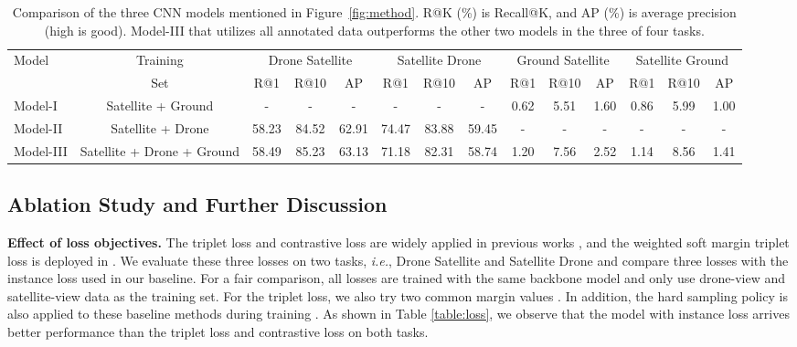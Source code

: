 \documentclass[sigconf]{acmart}
\def\ie{\emph{i.e.}}
\begin{document}
\setlength{\tabcolsep}{5pt}
\begin{table*}
\small
\begin{center}
\begin{tabular}{l|c|ccc|ccc|ccc|ccc}
\hline
\multirow{2}{*}{Model} & Training & \multicolumn{3}{c|}{Drone  Satellite} & \multicolumn{3}{c|}{Satellite  Drone} & \multicolumn{3}{c|}{Ground  Satellite} & 
\multicolumn{3}{c}{Satellite  Ground}\\
  & Set & R@1 & R@10 & AP & R@1 & R@10 & AP & R@1 & R@10 & AP & R@1 & R@10 & AP \\
\shline
Model-I & Satellite + Ground & - & - & - & - & - & - & 0.62 & 5.51 & 1.60 & 0.86 & 5.99 & 1.00 \\
Model-II & Satellite + Drone & 58.23 & 84.52 & 62.91 & 74.47 & 83.88 & 59.45 & - & - & - & - & - & -\\
Model-III & Satellite + Drone + Ground & 58.49 & 85.23 &  63.13 & 71.18 & 82.31 & 58.74 & 1.20 & 7.56 & 2.52 & 1.14 & 8.56 & 1.41 \\
\hline
\end{tabular}
\end{center}
\caption{Comparison of the three CNN models mentioned in Figure~\ref{fig:method}. R@K (\%) is Recall@K, and AP (\%) is average precision (high is good). Model-III that utilizes all annotated data outperforms the other two models in the three of four tasks.
}
\vspace{-.2in}
\label{table:Baseline}
\end{table*}


\subsection{Ablation Study and Further Discussion} \label{sec:ablation}
\noindent\textbf{Effect of loss objectives.}
The triplet loss and contrastive loss are widely applied in previous works \cite{lin2015learning,workman2015wide,deng2018triplet,chechik2010large,zheng2016discriminatively}, and the weighted soft margin triplet loss is deployed in \cite{hu2018cvm,liu2019lending,cai2019ground}. We evaluate these three losses on two tasks, \ie, Drone  Satellite and Satellite  Drone and compare three losses with the instance loss used in our baseline. For a fair comparison, all losses are trained with the same backbone model and only use drone-view and satellite-view data as the training set. For the triplet loss, we also try two common margin values . In addition, the hard sampling policy is also applied to these baseline methods during training \cite{hermans2017defense,oh2016deep}. As shown in Table \ref{table:loss}, we observe that the model with instance loss arrives better performance than the triplet loss and contrastive loss on both tasks.
\end{document}
